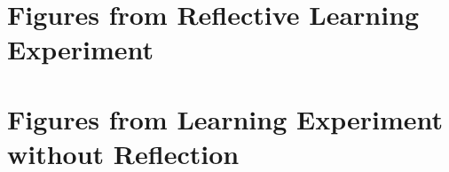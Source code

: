 
\clearpage
\section{Figures from Reflective Learning Experiment}


\clearpage
\section{Figures from Learning Experiment without Reflection}


